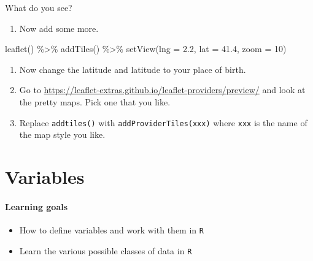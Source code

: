 \documentclass[
]{book}
\newenvironment{Shaded}{\begin{snugshade}}{\end{snugshade}}
\newcommand{\AttributeTok}[1]{\textcolor[rgb]{0.77,0.63,0.00}{#1}}
\newcommand{\DecValTok}[1]{\textcolor[rgb]{0.00,0.00,0.81}{#1}}
\newcommand{\FloatTok}[1]{\textcolor[rgb]{0.00,0.00,0.81}{#1}}
\newcommand{\FunctionTok}[1]{\textcolor[rgb]{0.00,0.00,0.00}{#1}}
\newcommand{\NormalTok}[1]{#1}
\newcommand{\SpecialCharTok}[1]{\textcolor[rgb]{0.00,0.00,0.00}{#1}}
\providecommand{\tightlist}{%
  \setlength{\itemsep}{0pt}\setlength{\parskip}{0pt}}
\begin{document}
What do you see?

\begin{enumerate}
\def\labelenumi{\arabic{enumi}.}
\setcounter{enumi}{7}
\tightlist
\item
  Now add some more.
\end{enumerate}

\begin{Shaded}
\begin{Highlighting}[]
\FunctionTok{leaflet}\NormalTok{() }\SpecialCharTok{\%\textgreater{}\%}
  \FunctionTok{addTiles}\NormalTok{() }\SpecialCharTok{\%\textgreater{}\%} 
  \FunctionTok{setView}\NormalTok{(}\AttributeTok{lng =} \FloatTok{2.2}\NormalTok{,}
          \AttributeTok{lat =} \FloatTok{41.4}\NormalTok{, }
          \AttributeTok{zoom =} \DecValTok{10}\NormalTok{)}
\end{Highlighting}
\end{Shaded}

\begin{enumerate}
\def\labelenumi{\arabic{enumi}.}
\setcounter{enumi}{8}
\item
  Now change the latitude and latitude to your place of birth.
\item
  Go to \url{https://leaflet-extras.github.io/leaflet-providers/preview/} and look at the pretty maps. Pick one that you like.
\item
  Replace \texttt{addtiles()} with \texttt{addProviderTiles(\textquotesingle{}xxx\textquotesingle{})} where \texttt{xxx} is the name of the map style you like.
\end{enumerate}

\hypertarget{variables}{%
\chapter{Variables}\label{variables}}

\hypertarget{learning-goals-3}{%
\subsubsection*{Learning goals}\label{learning-goals-3}}

\begin{itemize}
\tightlist
\item
  How to define variables and work with them in \texttt{R}\\
\item
  Learn the various possible classes of data in \texttt{R}
\end{itemize}
\end{document}
